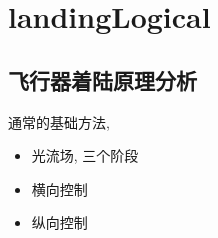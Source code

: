     \chapter{landingLogical}
    \section{飞行器着陆原理分析}   
    通常的基础方法,      
    \begin{itemize}
        \item 光流场, 三个阶段
        \item 横向控制
        \item 纵向控制
    \end{itemize}